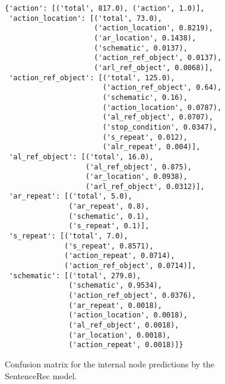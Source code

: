 \begin{figure}[t]
    \centering
    \begin{verbatim}
{'action': [('total', 817.0), ('action', 1.0)],
 'action_location': [('total', 73.0),
                     ('action_location', 0.8219),
                     ('ar_location', 0.1438),
                     ('schematic', 0.0137),
                     ('action_ref_object', 0.0137),
                     ('arl_ref_object', 0.0068)],
 'action_ref_object': [('total', 125.0),
                       ('action_ref_object', 0.64),
                       ('schematic', 0.16),
                       ('action_location', 0.0787),
                       ('al_ref_object', 0.0707),
                       ('stop_condition', 0.0347),
                       ('s_repeat', 0.012),
                       ('alr_repeat', 0.004)],
 'al_ref_object': [('total', 16.0),
                   ('al_ref_object', 0.875),
                   ('ar_location', 0.0938),
                   ('arl_ref_object', 0.0312)],
 'ar_repeat': [('total', 5.0),
               ('ar_repeat', 0.8),
               ('schematic', 0.1),
               ('s_repeat', 0.1)],
 's_repeat': [('total', 7.0),
              ('s_repeat', 0.8571),
              ('action_repeat', 0.0714),
              ('action_ref_object', 0.0714)],
 'schematic': [('total', 279.0),
               ('schematic', 0.9534),
               ('action_ref_object', 0.0376),
               ('ar_repeat', 0.0018),
               ('action_location', 0.0018),
               ('al_ref_object', 0.0018),
               ('ar_location', 0.0018),
               ('action_repeat', 0.0018)]}
    \end{verbatim}
    \caption{Confusion matrix for the internal node predictions by the SentenceRec model.}
    \label{fig:conf_int_senrec}
\end{figure}


